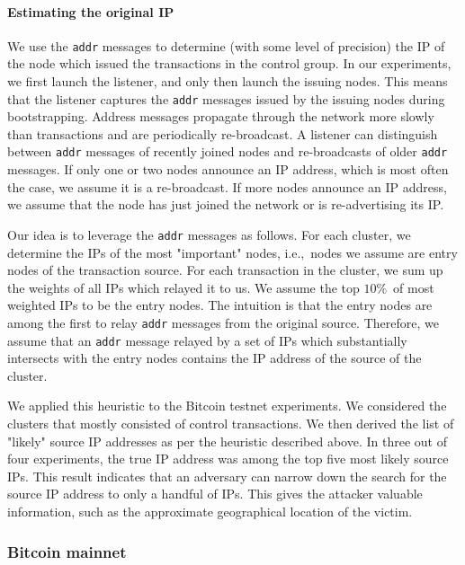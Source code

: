 \paragraph{Estimating the original IP}

We use the \texttt{addr} messages to determine (with some level of precision) the IP of the node which issued the transactions in the control group.
In our experiments, we first launch the listener, and only then launch the issuing nodes.
This means that the listener captures the \texttt{addr} messages issued by the issuing nodes during bootstrapping.
Address messages propagate through the network more slowly than transactions and are periodically re-broadcast.
A listener can distinguish between \texttt{addr} messages of recently joined nodes and re-broadcasts of older \texttt{addr} messages.
If only one or two nodes announce an IP address, which is most often the case, we assume it is a re-broadcast.
If more nodes announce an IP address, we assume that the node has just joined the network or is re-advertising its IP.

Our idea is to leverage the \texttt{addr} messages as follows.
For each cluster, we determine the IPs of the most "important" nodes, i.e.,~nodes we assume are entry nodes of the transaction source.
For each transaction in the cluster, we sum up the weights of all IPs which relayed it to us.
We assume the top $10\%$~of most weighted IPs to be the entry nodes.
The intuition is that the entry nodes are among the first to relay \texttt{addr} messages from the original source.
Therefore, we assume that an \texttt{addr} message relayed by a set of IPs which substantially intersects with the entry nodes contains the IP address of the source of the cluster.

We applied this heuristic to the Bitcoin testnet experiments.
We considered the clusters that mostly consisted of control transactions.
We then derived the list of "likely" source IP addresses as per the heuristic described above.
In three out of four experiments, the true IP address was among the top five most likely source IPs.
This result indicates that an adversary can narrow down the search for the source IP address to only a handful of IPs.
This gives the attacker valuable information, such as the approximate geographical location of the victim.

\subsubsection{Bitcoin mainnet}

